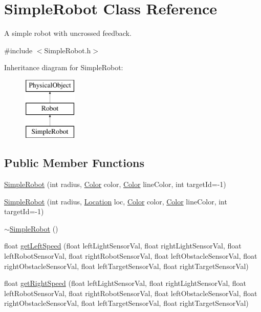 \hypertarget{classSimpleRobot}{\section{Simple\-Robot Class Reference}
\label{classSimpleRobot}
}


A simple robot with uncrossed feedback.  




{\ttfamily \#include $<$Simple\-Robot.\-h$>$}

Inheritance diagram for Simple\-Robot\-:\begin{figure}[H]
\begin{center}
\leavevmode
\includegraphics[height=3.000000cm]{classSimpleRobot}
\end{center}
\end{figure}
\subsection*{Public Member Functions}
\begin{DoxyCompactItemize}
\item 
\hyperlink{classSimpleRobot_a9ec65d80f5c030931fc07ab3ee5febb1}{Simple\-Robot} (int radius, \hyperlink{structColor}{Color} color, \hyperlink{structColor}{Color} line\-Color, int target\-Id=-\/1)
\item 
\hyperlink{classSimpleRobot_acad9f0762a53f5c294aff27ca2e433ce}{Simple\-Robot} (int radius, \hyperlink{structLocation}{Location} loc, \hyperlink{structColor}{Color} color, \hyperlink{structColor}{Color} line\-Color, int target\-Id=-\/1)
\item 
\hyperlink{classSimpleRobot_a3ef1551c84858e2b2c558d15380ced06}{$\sim$\-Simple\-Robot} ()
\item 
float \hyperlink{classSimpleRobot_a3dd2f39fc84a1d9fa4384c69255b3e79}{get\-Left\-Speed} (float left\-Light\-Sensor\-Val, float right\-Light\-Sensor\-Val, float left\-Robot\-Sensor\-Val, float right\-Robot\-Sensor\-Val, float left\-Obstacle\-Sensor\-Val, float right\-Obstacle\-Sensor\-Val, float left\-Target\-Sensor\-Val, float right\-Target\-Sensor\-Val)
\item 
float \hyperlink{classSimpleRobot_ae94b1dd9d31f2cbeb21fcbd5413a8a3a}{get\-Right\-Speed} (float left\-Light\-Sensor\-Val, float right\-Light\-Sensor\-Val, float left\-Robot\-Sensor\-Val, float right\-Robot\-Sensor\-Val, float left\-Obstacle\-Sensor\-Val, float right\-Obstacle\-Sensor\-Val, float left\-Target\-Sensor\-Val, float right\-Target\-Sensor\-Val)
\end{DoxyCompactItemize}
